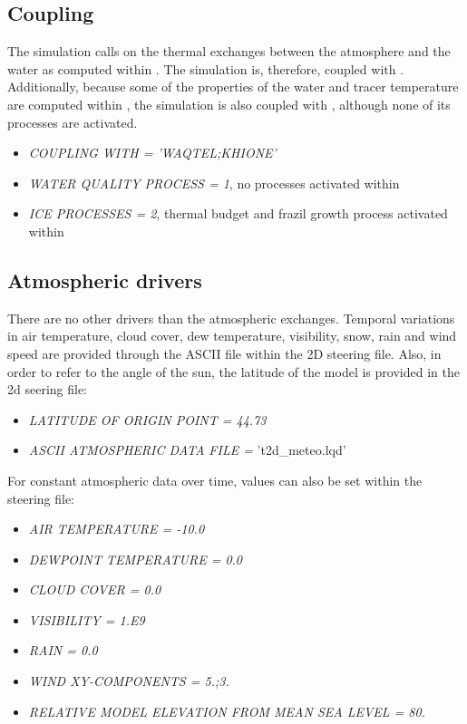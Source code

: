 \subsection{Coupling}
The simulation calls on the thermal exchanges between the atmosphere and the water as computed within \khione. The simulation is, therefore, coupled with \khione. Additionally, because some of the properties of the water and tracer temperature are computed within \waqtel, the simulation is also coupled with \waqtel, although none of its processes are activated.
\begin{itemize}
    \item\textit{COUPLING WITH = 'WAQTEL;KHIONE'}
    \item\textit{WATER QUALITY PROCESS = 1}, no processes activated within \waqtel
    \item\textit{ICE PROCESSES = 2}, thermal budget and frazil growth process activated within \khione
\end{itemize}

\subsection{Atmospheric drivers}

There are no other drivers than the atmospheric exchanges. Temporal variations in air temperature, cloud cover, dew temperature, visibility, snow, rain and wind speed are provided through the ASCII file within the \telemac2D steering file. Also, in order to refer to the angle of the sun, the latitude of the model is provided in the \telemac2d seering file:
\begin{itemize}
    \item\textit{LATITUDE OF ORIGIN POINT = 44.73}
    \item\textit{ASCII ATMOSPHERIC DATA FILE =} 't2d\_meteo.lqd'
\end{itemize}
For constant atmospheric data over time, values can also be set within the \khione steering file:
\begin{itemize}
    \item\textit{AIR TEMPERATURE      = -10.0}
    \item\textit{DEWPOINT TEMPERATURE =   0.0}
    \item\textit{CLOUD COVER          =   0.0}
    \item\textit{VISIBILITY           =   1.E9}
    \item\textit{RAIN                 =   0.0}
    \item\textit{WIND XY-COMPONENTS   =   5.;3.}
    \item\textit{RELATIVE MODEL ELEVATION FROM MEAN SEA LEVEL = 80.}
\end{itemize}

